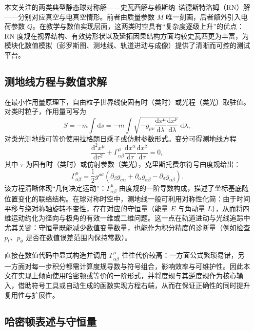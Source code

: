 \documentclass[a4paper,12pt]{article}
\begin{document}
本文关注的两类典型静态球对称解——史瓦西解与赖斯纳--诺德斯特洛姆（RN）解——分别对应真空与电真空情形。前者由质量参数 $M$ 唯一刻画，后者额外引入电荷参数 $Q$。在教学与数值实现层面，这两类时空具有“复杂度逐级上升”的优点：RN 度规在视界结构、有效势形状以及延拓因果结构方面均较史瓦西更为丰富，为模块化数值模拟（彭罗斯图、测地线、轨道进动与成像）提供了清晰而可控的测试平台。

\subsection{测地线方程与数值求解}

在最小作用量原理下，自由粒子世界线使固有时（类时）或光程（类光）取驻值。对类时粒子，作用量可写为
\begin{equation}
S=-m\int \mathrm{d}s=-m\int \sqrt{-g_{\mu\nu}\frac{\mathrm{d}x^\mu}{\mathrm{d}\lambda}\frac{\mathrm{d}x^\nu}{\mathrm{d}\lambda}}\; \mathrm{d}\lambda,
\end{equation}
对类光测地线可等价使用拉格朗日乘子或仿射参数形式。变分可得测地线方程
\begin{equation}
\frac{\mathrm{d}^2x^\mu}{\mathrm{d}\tau^2}+\Gamma^\mu_{\alpha\beta}\frac{\mathrm{d}x^\alpha}{\mathrm{d}\tau}\frac{\mathrm{d}x^\beta}{\mathrm{d}\tau}=0,
\end{equation}
其中 $\tau$ 为固有时（类时）或仿射参数（类光），克里斯托费尔符号由度规给出：
\begin{equation}
\Gamma^\mu_{\alpha\beta}
=\frac{1}{2}g^{\mu\sigma}\left(\partial_\beta g_{\sigma\alpha}+\partial_\alpha g_{\sigma\beta}-\partial_\sigma g_{\alpha\beta}\right).
\end{equation}
该方程清晰体现“几何决定运动”：$\Gamma^\mu_{\alpha\beta}$ 由度规的一阶导数构成，描述了坐标基底随位置变化的联络结构。在球对称时空中，测地线一般可利用对称性化简：由于时间平移与绕对称轴旋转不变性，存在对应的守恒量（能量 $E$ 与角动量 $L$），从而将四维运动约化为径向与极角的有效一维或二维问题。这一点在轨道进动与光线追踪中尤其关键：守恒量既能减少数值变量数量，也能作为积分精度的诊断量（例如检查 $p_t$、$p_\phi$ 是否在数值误差范围内保持常数）。

直接在数值代码中显式构造并调用 $\Gamma^\mu_{\alpha\beta}$ 往往代价较高：一方面公式繁琐易错，另一方面对每一步积分都需计算度规导数与符号组合，影响效率与可维护性。因此本文在实现上倾向使用哈密顿或等价的一阶形式，并将度规与其逆度规作为核心输入，借助符号工具或自动生成的函数实现方程右端，从而在保证正确性的同时提升复用性与扩展性。

\subsection{哈密顿表述与守恒量}
\end{document}
